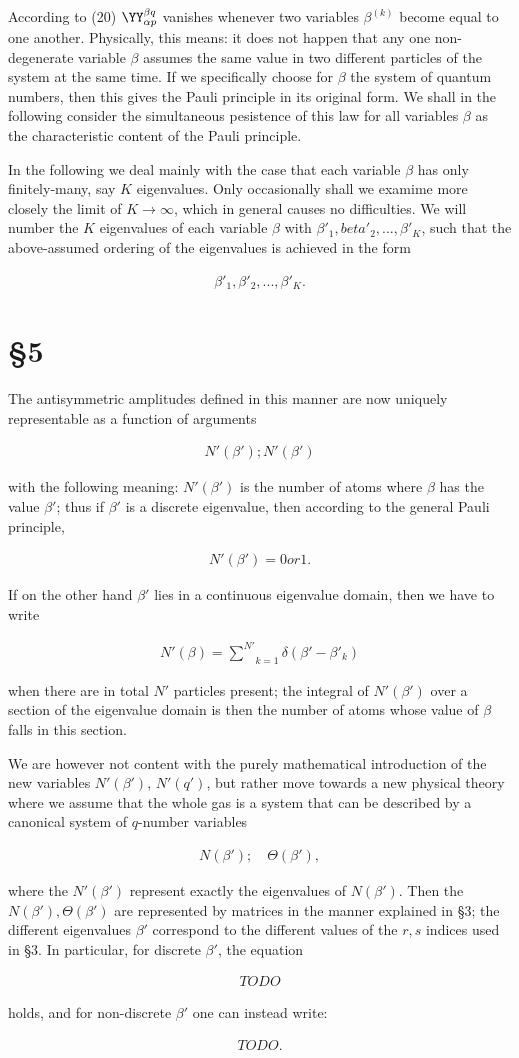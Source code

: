\documentclass{article}
\newcommand{\nequ}[2]{
\begin{align*}
#1
\tag{#2}
\end{align*}
}
\newcommand{\sumXY}[2]{\underset{#1}{\overset{#2}{\sum}}}
\begin{document}
According to (20) $\YY^{\beta q}_{\alpha p}$ vanishes whenever two variables $\beta^{(k)}$ become equal to one another. Physically, this means: it does not happen that any one non-degenerate variable $\beta$ assumes the same value in two different particles of the system at the same time. If we specifically choose for $\beta$ the system of quantum numbers, then this gives the Pauli principle in its original form. We shall in the following consider the simultaneous pesistence of this law for all variables $\beta$ as the characteristic content of the Pauli principle.

In the following we deal mainly with the case that each variable $\beta$ has only finitely-many, say $K$ eigenvalues. Only occasionally shall we examime more closely the limit of $K\to\infty$, which in general causes no difficulties. We will number the $K$ eigenvalues of each variable $\beta$ with $\beta'_1, beta'_2,...,\beta'_K$, such that the above-assumed ordering of the eigenvalues is achieved in the form
\nequ{
\beta'_1,\beta'_2,...,\beta'_K.
}{21}

\section*{§5}

The antisymmetric amplitudes defined in this manner are now uniquely representable as a function of arguments
\nequ{
N'(\beta'); N'(\beta')
}{22}
with the following meaning: $N'(\beta')$ is the number of atoms where $\beta$ has the value $\beta'$; thus if $\beta'$ is a discrete eigenvalue, then according to the general Pauli principle,
\nequ{
N'(\beta')=0 or 1.
}{23}
If on the other hand $\beta'$ lies in a continuous eigenvalue domain, then we have to write
\nequ{
N'(\beta) = \sumXY{k=1}{N'}\delta(\beta'-\beta'_k)
}{24}
when there are in total $N'$ particles present; the integral of $N'(\beta')$ over a section of the eigenvalue domain is then the number of atoms whose value of $\beta$ falls in this section.

We are however not content with the purely mathematical introduction of the new variables $N'(\beta')$, $N'(q')$, but rather move towards a new physical theory where we assume that the whole gas is a system that can be described by a canonical system of $q$-number variables
\nequ{
N(\beta'); \quad \Theta(\beta'),
}{25}
where the $N'(\beta')$ represent exactly the eigenvalues of $N(\beta')$. Then the $N(\beta'),\Theta(\beta')$ are represented by matrices in the manner explained in §3; the different eigenvalues $\beta'$ correspond to the different values of the $r,s$ indices used in §3. In particular, for discrete $\beta'$, the equation
\nequ{TODO}{26}
holds, and for non-discrete $\beta'$ one can instead write:
\nequ{
TODO.
}{27}
\end{document}
